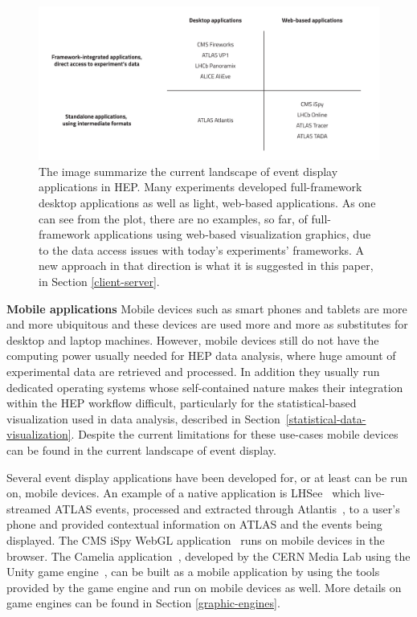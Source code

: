 \documentclass[12pt,a4paper]{article}
\begin{document}
\begin{figure}
	\centering
	\includegraphics[width=0.95\linewidth]{img/Current_Visualization_Landscape_v3}
	\caption[Current landscape of event display applications in HEP]{The image summarize the current landscape of event display applications in HEP.
	Many experiments developed full-framework desktop applications as well as light, web-based applications. As one can see from the plot,
	there are no examples, so far, of full-framework applications using web-based visualization graphics, due to the data access issues
	with today's experiments' frameworks. A new approach in that direction is what it is suggested in this paper, in Section \ref{client-server}.}
	\label{fig:currentvisualizationlandscape}
\end{figure}

{\bf Mobile applications} Mobile devices such as smart phones and tablets are more and more ubiquitous and these devices
are used more and more as substitutes for desktop and laptop machines.
However, mobile devices still do not have the computing power usually needed for HEP data analysis, where huge amount of experimental data
are retrieved and processed. In addition they usually run dedicated operating systems whose self-contained nature
makes their integration within the HEP workflow difficult, particularly for the statistical-based visualization used in
data analysis, described in Section~\ref{statistical-data-visualization}. Despite the current limitations for these use-cases mobile
devices can be found in the current landscape of event display.

Several event display applications have been developed for, or at least can be run on, mobile devices.
An example of a native application is LHSee~\cite{LHSee} which live-streamed ATLAS events, processed and extracted
through Atlantis~\cite{ATLASAtlantis},
to a user’s phone and provided contextual information on ATLAS and the
events being displayed. The CMS iSpy WebGL application~\cite{CMSISpyWebGL} runs on mobile devices in the browser.
The Camelia application~\cite{CERNCamelia}, %
developed by the CERN Media Lab using the Unity game engine~\cite{Unity3D}, can be built as a mobile application
by using the tools provided by the game engine and run on mobile devices as well.
More details on game engines can be found in Section \ref{graphic-engines}.
\end{document}
